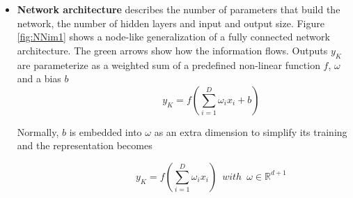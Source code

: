 \begin{itemize}
\item \textbf{Network architecture} describes the number of parameters that build the network, the number of hidden layers and input and output size. Figure \ref{fig:NNim1} shows a node-like generalization of a  fully connected network architecture. The green arrows show how the information flows. Outputs $y_K$ are parameterize as a weighted sum of a predefined non-linear function $f$, $\omega$ and a bias $b$  
\begin{equation} \label{eq:paramNN}
\hspace{3em} \hspace{3em} \hspace{3em} y_K = f ( \sum_{i=1}^D \omega_i x_i + b  ) \enspace \hspace{3em}
\end{equation} 


Normally, $b$ is embedded into $\omega$ as an extra dimension to simplify its training and the representation becomes  

\begin{equation} \label{eq:paramNN}
\hspace{3em} \hspace{3em} \hspace{3em} y_K = f ( \sum_{i=1}^D \omega_i x_i  ) \enspace with \enspace  \omega \in \mathbb{R}^{d+1} \enspace \hspace{3em}
\end{equation}   


\end{itemize}
